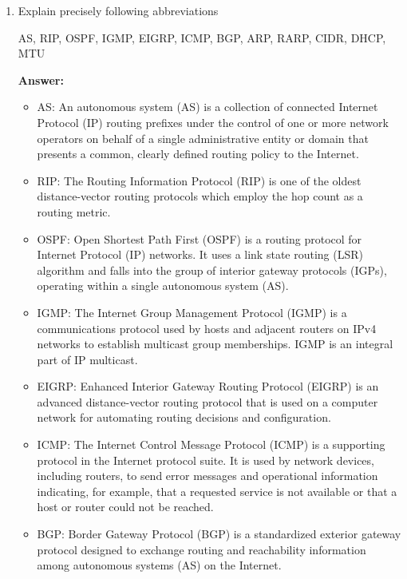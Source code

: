 \begin{enumerate}
    \item Explain precisely following abbreviations

	AS, RIP, OSPF, IGMP, EIGRP, ICMP, BGP, ARP, RARP, CIDR, DHCP, MTU
	
	\textbf{Answer:}
	
	\begin{itemize}
	    \item AS: An autonomous system (AS) is a collection of connected Internet Protocol (IP) routing prefixes under the control of one or more network operators on behalf of a single administrative entity or domain that presents a common, clearly defined routing policy to the Internet.
	    
	    \item RIP: The Routing Information Protocol (RIP) is one of the oldest distance-vector routing protocols which employ the hop count as a routing metric.
	    
	    \item OSPF: Open Shortest Path First (OSPF) is a routing protocol for Internet Protocol (IP) networks. It uses a link state routing (LSR) algorithm and falls into the group of interior gateway protocols (IGPs), operating within a single autonomous system (AS).
	    
	    \item IGMP: The Internet Group Management Protocol (IGMP) is a communications protocol used by hosts and adjacent routers on IPv4 networks to establish multicast group memberships. IGMP is an integral part of IP multicast.
	    
	    \item EIGRP: Enhanced Interior Gateway Routing Protocol (EIGRP) is an advanced distance-vector routing protocol that is used on a computer network for automating routing decisions and configuration.
	    
	    \item ICMP: The Internet Control Message Protocol (ICMP) is a supporting protocol in the Internet protocol suite. It is used by network devices, including routers, to send error messages and operational information indicating, for example, that a requested service is not available or that a host or router could not be reached.
	    
	    \item BGP: Border Gateway Protocol (BGP) is a standardized exterior gateway protocol designed to exchange routing and reachability information among autonomous systems (AS) on the Internet.
	    

\end{itemize}
\end{enumerate}
